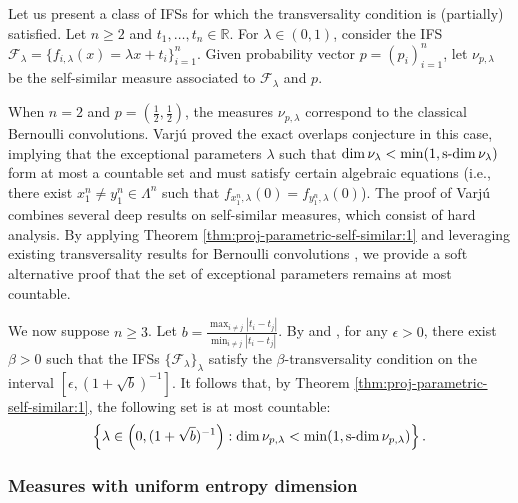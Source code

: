 \documentclass[a4paper,11pt]{amsart}
\theoremstyle{definition}
\newtheorem{definition}[theorem]{Definition}
\numberwithin{equation}{section}
\def\to{\rightarrow}
\def\D{\mathcal{D}}
\def\cP{\mathcal P}
\def\F{\mathcal F}
\def\N{\mathbb N}
\def\R{\mathbb R}
\DeclareMathOperator{\sd}{{\rm{s}\textrm{-}\rm{dim}}}
\begin{document}
Let us present a class of IFSs for which the transversality condition is (partially) satisfied.  Let $n\ge 2$ and $t_1,\ldots,t_n\in \R$. For $\lambda\in (0,1)$,  consider the IFS $\F_\lambda=\{f_{i,\lambda}(x)=\lambda x+t_i\}_{i=1}^n$.  Given probability vector $p=(p_i)_{i=1}^n$, let $\nu_{p,\lambda}$ be the self-similar measure associated to $\F_\lambda$ and $p$.

When $n=2$ and $p=(\frac{1}{2},\frac{1}{2})$, the measures $\nu_{p,\lambda}$ correspond to the classical Bernoulli convolutions.  Varj\'u \cite{Varju-Annals} proved the exact overlaps conjecture in this case, implying that the exceptional parameters $\lambda$ such that $\dim \nu_\lambda<\min(1,\sd \nu_\lambda)$ form at most a countable set and must satisfy certain algebraic equations (i.e., there exist $x_1^n\neq y_1^n\in \Lambda^n$ such that $f_{x_1^n,\lambda}(0)=f_{y_1^n,\lambda}(0)$).   The proof of Varj\'u combines several deep results on self-similar measures,   which consist of hard analysis.  By applying Theorem \ref{thm:proj-parametric-self-similar:1} and leveraging existing transversality results for Bernoulli convolutions \cite{Solomyak-Annals, Peres-Solomyak-simple}, we provide a soft alternative proof that the set of exceptional parameters remains at most countable.

We now suppose $n\ge 3$.  Let $b=\frac{\max_{i\neq j}|t_i-t_j|}{\min_{i\neq j}|t_i-t_j|}$.  By \cite[Corollary 5.2]{Peres-Solomyak-1998}  and \cite[Lemma 5.9]{Peres-Schlag},  for any $\epsilon>0$,  there exist $\beta>0$ such that the IFSs $\{\F_{\lambda}\}_\lambda$ satisfy the $\beta$-transversality condition on the interval $[\epsilon,(1+\sqrt{b})^{-1}]$.  It follows that, by Theorem \ref{thm:proj-parametric-self-similar:1}, the following set is at most countable:
\[
\left\{\lambda\in \left(0,(1+\sqrt{b})^{-1}\right): \dim \nu_{p, \lambda}<\min(1,\sd \nu_{p, \lambda})\right\}.
\] 


\subsubsection{Measures with uniform entropy dimension}\label{section: meas-uniform-ent-dimension:0}

\end{document}

